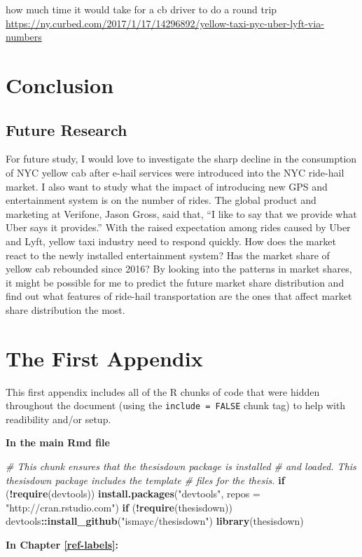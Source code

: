 \documentclass[12pt,twoside]{reedthesis}
\newenvironment{Shaded}{\begin{snugshade}}{\end{snugshade}}
\newcommand{\KeywordTok}[1]{\textcolor[rgb]{0.13,0.29,0.53}{\textbf{#1}}}
\newcommand{\DataTypeTok}[1]{\textcolor[rgb]{0.13,0.29,0.53}{#1}}
\newcommand{\StringTok}[1]{\textcolor[rgb]{0.31,0.60,0.02}{#1}}
\newcommand{\CommentTok}[1]{\textcolor[rgb]{0.56,0.35,0.01}{\textit{#1}}}
\newcommand{\ControlFlowTok}[1]{\textcolor[rgb]{0.13,0.29,0.53}{\textbf{#1}}}
\newcommand{\OperatorTok}[1]{\textcolor[rgb]{0.81,0.36,0.00}{\textbf{#1}}}
\newcommand{\NormalTok}[1]{#1}
\theoremstyle{definition}
\theoremstyle{definition}
\theoremstyle{definition}
\theoremstyle{remark}
\begin{document}
how much time it would take for a cb driver to do a round trip
\url{https://ny.curbed.com/2017/1/17/14296892/yellow-taxi-nyc-uber-lyft-via-numbers}

\chapter{Conclusion}\label{chapter5}

\section{Future Research}\label{future-research}

For future study, I would love to investigate the sharp decline in the
consumption of NYC yellow cab after e-hail services were introduced into
the NYC ride-hail market. I also want to study what the impact of
introducing new GPS and entertainment system is on the number of rides.
The global product and marketing at Verifone, Jason Gross, said that,
``I like to say that we provide what Uber says it provides.'' With the
raised expectation among rides caused by Uber and Lyft, yellow taxi
industry need to respond quickly. How does the market react to the newly
installed entertainment system? Has the market share of yellow cab
rebounded since 2016? By looking into the patterns in market shares, it
might be possible for me to predict the future market share distribution
and find out what features of ride-hail transportation are the ones that
affect market share distribution the most.

\appendix

\chapter{The First Appendix}\label{the-first-appendix}

This first appendix includes all of the R chunks of code that were
hidden throughout the document (using the \texttt{include\ =\ FALSE}
chunk tag) to help with readibility and/or setup.

\textbf{In the main Rmd file}
\begin{Shaded}
\begin{Highlighting}[]
\CommentTok{# This chunk ensures that the thesisdown package is installed}
\CommentTok{# and loaded. This thesisdown package includes the template}
\CommentTok{# files for the thesis.}
\ControlFlowTok{if}\NormalTok{ (}\OperatorTok{!}\KeywordTok{require}\NormalTok{(devtools)) }\KeywordTok{install.packages}\NormalTok{(}\StringTok{"devtools"}\NormalTok{, }\DataTypeTok{repos =} \StringTok{"http://cran.rstudio.com"}\NormalTok{)}
\ControlFlowTok{if}\NormalTok{ (}\OperatorTok{!}\KeywordTok{require}\NormalTok{(thesisdown)) devtools}\OperatorTok{::}\KeywordTok{install_github}\NormalTok{(}\StringTok{"ismayc/thesisdown"}\NormalTok{)}
\KeywordTok{library}\NormalTok{(thesisdown)}
\end{Highlighting}
\end{Shaded}
\textbf{In Chapter \ref{ref-labels}:}
\end{document}
